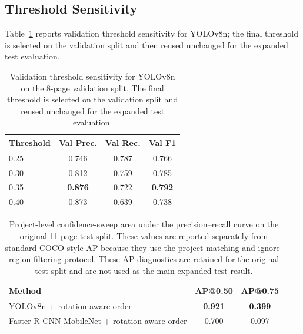 \documentclass[12pt]{article}
\begin{document}
\subsection{Threshold Sensitivity}
Table~\ref{tab:threshold} reports validation threshold sensitivity for YOLOv8n; the final threshold is selected on the validation split and then reused unchanged for the expanded test evaluation.
\begin{table}[t]
\centering
\scriptsize\setlength{\tabcolsep}{3pt}
\caption{Validation threshold sensitivity for YOLOv8n on the 8-page validation split. The final threshold is selected on the validation split and reused unchanged for the expanded test evaluation.}
\label{tab:threshold}
\begin{tabular}{lccc}
\toprule
Threshold & Val Prec. & Val Rec. & Val F1 \\
\midrule
0.25 & 0.746 & 0.787 & 0.766 \\
0.30 & 0.812 & 0.759 & 0.785 \\
0.35 & \textbf{0.876} & 0.722 & \textbf{0.792} \\
0.40 & 0.873 & 0.639 & 0.738 \\
\bottomrule
\end{tabular}
\end{table}


\begin{table}[t]
\centering
\scriptsize\setlength{\tabcolsep}{3pt}
\caption{Project-level confidence-sweep area under the precision--recall curve on the original 11-page test split. These values are reported separately from standard COCO-style AP because they use the project matching and ignore-region filtering protocol. These AP diagnostics are retained for the original test split and are not used as the main expanded-test result.}
\label{tab:project_ap}
\begin{tabular}{lcc}
\toprule
Method & AP@0.50 & AP@0.75 \\
\midrule
YOLOv8n + rotation-aware order & \textbf{0.921} & \textbf{0.399} \\
Faster R-CNN MobileNet + rotation-aware order & 0.700 & 0.097 \\
\bottomrule
\end{tabular}
\end{table}
\end{document}
